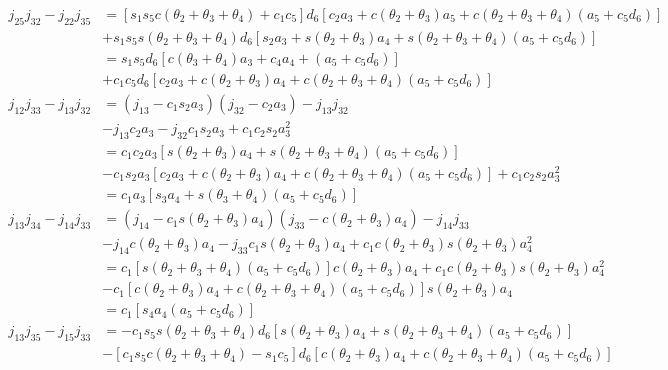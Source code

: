 \begin{align*}
    j_{25}j_{32} - j_{22}j_{35} &= [s_1s_5c(\theta_2+\theta_3+\theta_4)+c_1c_5]d_6[c_2a_3 + c(\theta_2+\theta_3)a_5 + c(\theta_2+\theta_3+\theta_4)(a_5+c_5d_6)] \\
                                & +s_1s_5s(\theta_2+\theta_3+\theta_4)d_6[s_2a_3+s(\theta_2+\theta_3)a_4 + s(\theta_2+\theta_3+\theta_4)(a_5+c_5d_6)] \\
                                &= s_1s_5d_6[c(\theta_3+\theta_4)a_3 + c_4a_4 + (a_5+c_5d_6)]\\
                                &+c_1c_5d_6[c_2a_3+c(\theta_2+\theta_3)a_4+c(\theta_2+\theta_3+\theta_4)(a_5+c_5d_6)]\\
    j_{12}j_{33} - j_{13}j_{32} &= (j_{13}-c_1s_2a_3)(j_{32}-c_2a_3) - j_{13}j_{32} \\
                                & -j_{13}c_2a_3 - j_{32}c_1s_2a_3 +c_1c_2s_2a_3^2 \\
                                &= c_1c_2a_3[s(\theta_2+\theta_3)a_4+s(\theta_2+\theta_3+\theta_4)(a_5+c_5d_6)] \\
                                & -c_1s_2a_3[c_2a_3+c(\theta_2+\theta_3)a_4+c(\theta_2+\theta_3+\theta_4)(a_5+c_5d_6)] + c_1c_2s_2a_3^2 \\
                                &= c_1a_3[s_3a_4+s(\theta_3+\theta_4)(a_5+c_5d_6)]\\
    j_{13}j_{34} - j_{14}j_{33} &= (j_{14} - c_1s(\theta_2+\theta_3)a_4)(j_{33} - c(\theta_2+\theta_3)a_4) - j_{14}j_{33} \\
                                & -j_{14}c(\theta_2+\theta_3)a_4 - j_{33}c_1s(\theta_2+\theta_3)a_4 + c_1c(\theta_2+\theta_3)s(\theta_2+\theta_3)a_4^2 \\
                                &= c_1[s(\theta_2+\theta_3+\theta_4)(a_5+c_5d_6)]c(\theta_2+\theta_3)a_4 +c_1c(\theta_2+\theta_3)s(\theta_2+\theta_3)a_4^2 \\
                                & -c_1[c(\theta_2+\theta_3)a_4 + c(\theta_2+\theta_3+\theta_4)(a_5+c_5d_6)]s(\theta_2+\theta_3)a_4 \\
                                &= c_1[s_4a_4(a_5+c_5d_6)]\\        
    j_{13}j_{35} - j_{15}j_{33} &= -c_1s_5s(\theta_2+\theta_3+\theta_4)d_6[s(\theta_2+\theta_3)a_4+s(\theta_2+\theta_3+\theta_4)(a_5+c_5d_6)] \\
                                & -[c_1s_5c(\theta_2+\theta_3+\theta_4)-s_1c_5]d_6[c(\theta_2+\theta_3)a_4+c(\theta_2+\theta_3+\theta_4)(a_5+c_5d_6)] \\

\end{align*}
